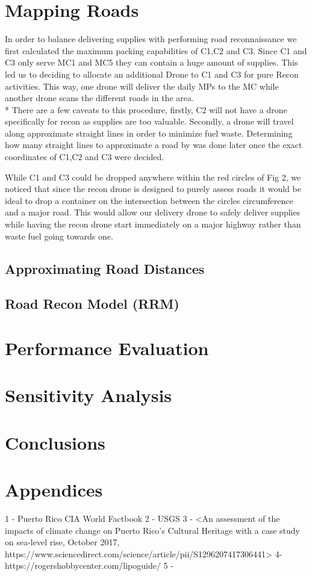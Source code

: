 \documentclass[a4paper,12pt]{article}
\begin{document}
\newpage

\section{Mapping Roads}
In order to balance delivering supplies with performing road reconnaissance we first calculated the maximum packing capabilities of C1,C2 and C3.
Since C1 and C3 only serve MC1 and MC5 they can contain a huge amount of supplies. This led us to deciding to allocate an additional Drone to C1 and C3 for pure Recon activities.
This way, one drone will deliver the daily MPs to the MC while another drone scans the different roads in the area.\\*
There are a few caveats to this procedure, firstly, C2 will not have a drone specifically for recon as supplies are too valuable.
Secondly, a drone will travel along approximate straight lines in order to minimize fuel waste. Determining how many straight lines to approximate a road by was done later once the exact coordinates of C1,C2 and C3 were decided.


While C1 and C3 could be dropped anywhere within the red circles of Fig 2, we noticed that since the recon drone is designed to purely assess roads it would be ideal to drop a container on the intersection between the circles circumference and a major road.
This would allow our delivery drone to safely deliver supplies while having the recon drone start immediately on a major highway rather than waste fuel going towards one.
\subsection{Approximating Road Distances}
\subsection{Road Recon Model (RRM)}


\newpage

\section{Performance Evaluation}

\newpage

\section{Sensitivity Analysis}

\newpage

\section{Conclusions}

\newpage

\section{Appendices}
1 - Puerto Rico CIA World Factbook
2 - USGS
3 - <An assessment of the impacts of climate change on Puerto Rico's Cultural Heritage with a case study on sea-level rise, October 2017, https://www.sciencedirect.com/science/article/pii/S1296207417306441>
4- https://rogershobbycenter.com/lipoguide/
5 -
\end{document}
